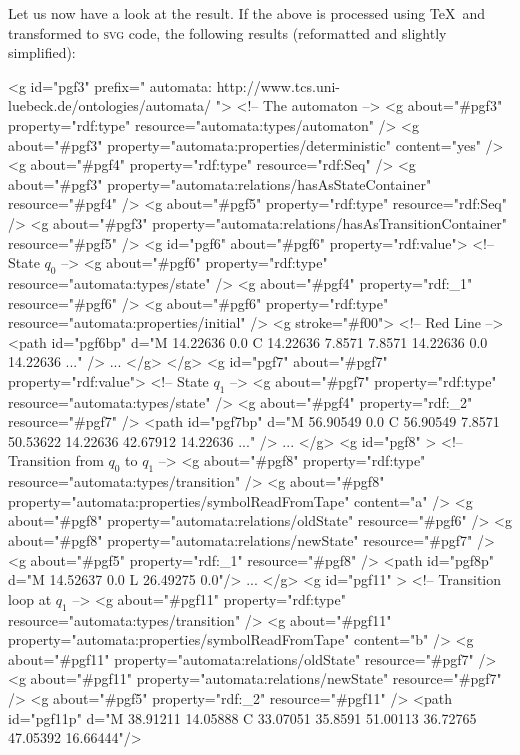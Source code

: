 Let us now have a look at the result. If the above is processed using \TeX\ and
transformed to \textsc{svg} code, the following results (reformatted and
slightly simplified):
%
\begin{codeexample}[multipage]
<g id="pgf3"  prefix=" automata: http://www.tcs.uni-luebeck.de/ontologies/automata/ ">
  <!-- The automaton -->
  <g about="#pgf3" property="rdf:type" resource="automata:types/automaton" />
  <g about="#pgf3" property="automata:properties/deterministic" content="yes" />
  <g about="#pgf4" property="rdf:type" resource="rdf:Seq" />
  <g about="#pgf3" property="automata:relations/hasAsStateContainer" resource="#pgf4" />
  <g about="#pgf5" property="rdf:type" resource="rdf:Seq" />
  <g about="#pgf3" property="automata:relations/hasAsTransitionContainer" resource="#pgf5" />
  <g id="pgf6"  about="#pgf6" property="rdf:value">
    <!-- State $q_0$ -->
    <g about="#pgf6" property="rdf:type" resource="automata:types/state" />
    <g about="#pgf4" property="rdf:_1" resource="#pgf6" />
    <g about="#pgf6" property="rdf:type" resource="automata:properties/initial" />
    <g stroke="#f00">    <!-- Red Line -->
      <path id="pgf6bp" d="M 14.22636 0.0 C 14.22636 7.8571 7.8571 14.22636 0.0 14.22636 ..." />
      ...
    </g>
  </g>
  <g id="pgf7"  about="#pgf7" property="rdf:value">
    <!-- State $q_1$ -->
    <g about="#pgf7" property="rdf:type" resource="automata:types/state" />
    <g about="#pgf4" property="rdf:_2" resource="#pgf7" />
    <path id="pgf7bp" d="M 56.90549 0.0 C 56.90549 7.8571 50.53622 14.22636 42.67912 14.22636 ..." />
    ...
  </g>
  <g id="pgf8" >
    <!-- Transition from $q_0$ to $q_1$ -->
    <g about="#pgf8" property="rdf:type" resource="automata:types/transition" />
    <g about="#pgf8" property="automata:properties/symbolReadFromTape" content="a" />
    <g about="#pgf8" property="automata:relations/oldState" resource="#pgf6" />
    <g about="#pgf8" property="automata:relations/newState" resource="#pgf7" />
    <g about="#pgf5" property="rdf:_1" resource="#pgf8" />
    <path id="pgf8p" d="M 14.52637 0.0 L 26.49275 0.0"/>
    ...
  </g>
  <g id="pgf11" >
    <!-- Transition loop at $q_1$ -->
    <g about="#pgf11" property="rdf:type" resource="automata:types/transition" />
    <g about="#pgf11" property="automata:properties/symbolReadFromTape" content="b" />
    <g about="#pgf11" property="automata:relations/oldState" resource="#pgf7" />
    <g about="#pgf11" property="automata:relations/newState" resource="#pgf7" />
    <g about="#pgf5" property="rdf:_2" resource="#pgf11" />
    <path id="pgf11p" d="M 38.91211 14.05888 C 33.07051 35.8591 51.00113 36.72765 47.05392 16.66444"/>

\end{codeexample}
